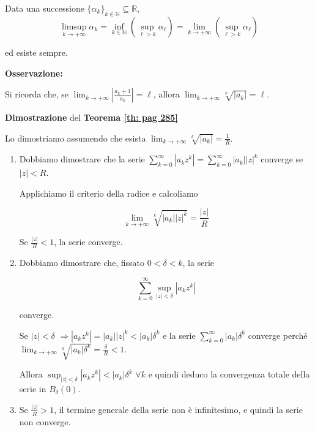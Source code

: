 \begin{definition}
	Data una successione $\{\alpha_k\}_{k\in\mathbb{N}}\subseteq \mathbb{R}$, 
	\begin{equation*}
		\limsup_{k\rightarrow+\infty} \alpha_k=\inf_{k\in\mathbb{N}}\left(\sup_{\ell>k} \alpha_\ell\right)=\lim_{k \rightarrow+\infty}\left(\sup_{\ell>k}\alpha_\ell\right)
	\end{equation*}
	
	ed esiste sempre.
	
\end{definition}


\textbf{Osservazione:}

Si ricorda che, se $\lim_{k\rightarrow+\infty}|\frac{a_k+1}{a_k}|=\ell$, allora $\lim_{k\rightarrow+\infty}\sqrt[k]{|a_k|}=\ell$.


\begin{dembar}
	\textbf{Dimostrazione} del \textbf{Teorema \ref{th: pag 285}}
	
	Lo dimostriamo assumendo che esista $\lim_{k\rightarrow+\infty}\sqrt[k]{|a_k|}=\frac{1}{R}$.
	\begin{enumerate}
		\item Dobbiamo dimostrare che la serie $\sum_{k=0}^{\infty}|a_kz^k|=\sum_{k=0}^{\infty}|a_k||z|^k$ converge se $|z|<R$.
		
		Applichiamo il criterio della radice e calcoliamo 
		
		$$\lim_{k \rightarrow+\infty}\sqrt[k]{|a_k||z|^k}=\frac{|z|}{R}$$
		
		Se $\frac{|z|}{R}<1$, la serie converge.
		
		\item Dobbiamo dimostrare che, fissato $0<\delta<k$, la serie 
		
		$$\sum_{k=0}^{\infty}\sup_{|z|<\delta} |a_kz^k|$$ 
		
		converge.
		
		Se $|z|<\delta$ $\Rightarrow |a_kz^k|=|a_k||z|^k<|a_k|\delta^k$ e la serie $\sum_{k=0}^{\infty}|a_k|\delta^k$ converge perché $\lim_{k \rightarrow+\infty} \sqrt[k]{|a_k|\delta^k}=\frac{\delta}{R}<1$. 
		
		Allora $\sup_{|z|<\delta}|a_kz^k|<|a_k|\delta^k\,\, \forall k$ e quindi deduco la convergenza totale della serie in $B_{\delta}(0)$.
		
		\item Se $\frac{|z|}{R}>1$, il termine generale della serie non è infinitesimo, e quindi la serie non converge.
	\end{enumerate}
\end{dembar}


